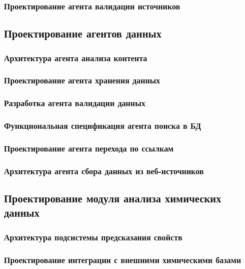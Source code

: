 \documentclass{syksu-coursework}
\begin{document}
\subsubsection{Проектирование агента валидации источников}

\subsection{Проектирование агентов данных}

\subsubsection{Архитектура агента анализа контента}

\subsubsection{Проектирование агента хранения данных}

\subsubsection{Разработка агента валидации данных}

\subsubsection{Функциональная спецификация агента поиска в БД}

\subsubsection{Проектирование агента перехода по ссылкам}

\subsubsection{Архитектура агента сбора данных из веб-источников}

\subsection{Проектирование модуля анализа химических данных}

\subsubsection{Архитектура подсистемы предсказания свойств}

\subsubsection{Проектирование интеграции с внешними химическими базами}
\end{document}
